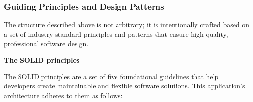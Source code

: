 \subsubsection{Guiding Principles and Design Patterns}
\label{sec:principles-and-patterns}

The structure described above is not arbitrary; it is intentionally crafted based on a set of industry-standard principles and patterns that ensure high-quality, professional software design. 

\textbf{The SOLID principles}

The SOLID principles are a set of five foundational guidelines that help developers create maintainable and flexible software solutions. This application's architecture adheres to them as follows:

\vspace{2cm}

